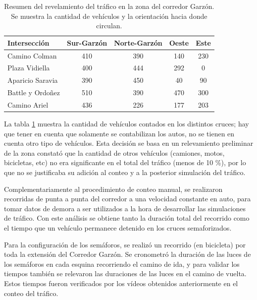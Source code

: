 \begin{table}[H]
	\renewcommand{\arraystretch}{1.2}
	\caption[Resumen del revelamiento del tráfico en la zona del corredor Garzón.]{Resumen del revelamiento del tráfico en la zona del corredor Garzón. Se muestra la cantidad de vehículos y la orientación hacia donde circulan.}
	\label{table:resumen_trafico}
	\centering
	\begin{tabular}{lcccc}
		\hline
		Intersección&
		Sur-Garzón& 
		Norte-Garzón & 
		Oeste &
		Este 
		\\ 
		\hline
		Camino Colman  & 410 & 390 & 140 & 230\\		
		Plaza Vidiella  & 400 & 444 & 292 & 0\\		
		Aparicio Saravia  & 390 & 450 & 40 & 90\\		
		Battle y Ordoñez  & 510 & 390 & 470 & 300 \\	
		Camino Ariel  & 436 & 226 & 177 & 203 \\													
		\hline
		
		
		\hline
	\end{tabular}
\end{table}

La tabla \ref{table:resumen_trafico} muestra la cantidad de vehículos contados en los distintos cruces; hay que tener en cuenta que solamente se contabilizan los autos, no se tienen en cuenta otro tipo de vehículos. Esta decisión se basa en un relevamiento preliminar de la zona constató que la cantidad de otros vehículos (camiones, motos, bicicletas, etc) no era significante en el total del tráfico (menos de 10 \%), por lo que no se justificaba su adición al conteo y a la posterior simulación del tráfico.

Complementariamente al procedimiento de conteo manual, se realizaron recorridas de punta a punta del corredor a una velocidad constante en auto, para tomar datos de demora a ser utilizados a la hora de desarrollar las simulaciones de tráfico. Con este análisis se obtiene tanto la duración total del recorrido como el tiempo que un vehículo permanece detenido en los cruces semaforizados. 

Para la configuración de los semáforos, se realizó un recorrido (en bicicleta) por toda la extensión del Corredor Garzón. Se cronometró la duración de las luces de los semáforos en cada esquina recorriendo el camino de ida, y para validar los tiempos también se relevaron las duraciones de las luces en el camino de vuelta. Estos tiempos fueron verificados por los vídeos obtenidos anteriormente en el conteo del tráfico.


